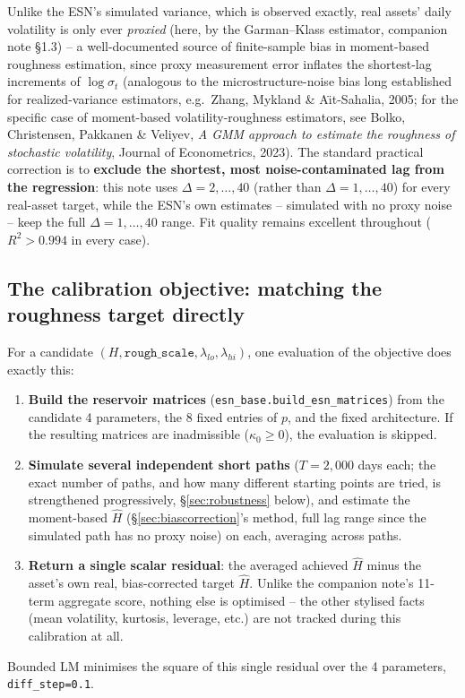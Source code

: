 \documentclass[11pt]{article}
\begin{document}
Unlike the ESN's simulated variance, which is observed exactly, real assets' daily
volatility is only ever \emph{proxied} (here, by the Garman--Klass estimator,
companion note \S1.3) -- a well-documented source of finite-sample bias in
moment-based roughness estimation, since proxy measurement error inflates the
shortest-lag increments of $\log\sigma_t$ (analogous to the microstructure-noise
bias long established for realized-variance estimators, e.g.\ Zhang, Mykland \&
A\"{\i}t-Sahalia, 2005; for the specific case of moment-based volatility-roughness
estimators, see Bolko, Christensen, Pakkanen \& Veliyev, \emph{A GMM approach to
estimate the roughness of stochastic volatility}, Journal of Econometrics, 2023).
The standard practical correction is to \textbf{exclude the shortest, most
noise-contaminated lag from the regression}: this note uses $\Delta=2,\dots,40$
(rather than $\Delta=1,\dots,40$) for every real-asset target, while the ESN's own
estimates -- simulated with no proxy noise -- keep the full $\Delta=1,\dots,40$
range. Fit quality remains excellent throughout ($R^2>0.994$ in every case).

\subsection{The calibration objective: matching the roughness target directly}
\label{sec:objective}
For a candidate $(H,\texttt{rough\_scale},\lambda_{lo},\lambda_{hi})$, one
evaluation of the objective does exactly this:
\begin{enumerate}
\item \textbf{Build the reservoir matrices} (\texttt{esn\_base.build\_esn\_matrices})
from the candidate 4 parameters, the 8 fixed entries of $p$, and the fixed
architecture. If the resulting matrices are inadmissible ($\kappa_0\ge0$), the
evaluation is skipped.
\item \textbf{Simulate several independent short paths} ($T=2{,}000$ days each; the
exact number of paths, and how many different starting points are tried, is
strengthened progressively, \S\ref{sec:robustness} below), and estimate the
moment-based $\hat H$ (\S\ref{sec:biascorrection}'s method, full lag range since the
simulated path has no proxy noise) on each, averaging across paths.
\item \textbf{Return a single scalar residual}: the averaged achieved $\hat H$ minus
the asset's own real, bias-corrected target $\hat H$. Unlike the companion note's
11-term aggregate score, nothing else is optimised -- the other stylised facts
(mean volatility, kurtosis, leverage, etc.) are not tracked during this
calibration at all.
\end{enumerate}
Bounded LM minimises the square of this single residual over the 4 parameters,
\texttt{diff\_step=0.1}.
\end{document}
